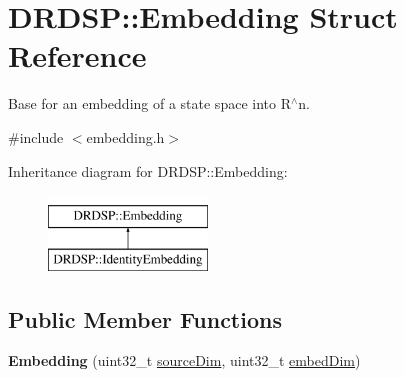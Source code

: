 \hypertarget{struct_d_r_d_s_p_1_1_embedding}{\section{D\-R\-D\-S\-P\-:\-:Embedding Struct Reference}
\label{struct_d_r_d_s_p_1_1_embedding}
}


Base for an embedding of a state space into R$^\wedge$n.  




{\ttfamily \#include $<$embedding.\-h$>$}

Inheritance diagram for D\-R\-D\-S\-P\-:\-:Embedding\-:\begin{figure}[H]
\begin{center}
\leavevmode
\includegraphics[height=2.000000cm]{struct_d_r_d_s_p_1_1_embedding}
\end{center}
\end{figure}
\subsection*{Public Member Functions}
\begin{DoxyCompactItemize}
\item 
\hypertarget{struct_d_r_d_s_p_1_1_embedding_a761628175adca44353dfae4c5adabe1f}{{\bfseries Embedding} (uint32\-\_\-t \hyperlink{struct_d_r_d_s_p_1_1_embedding_a31e1f302b771269d2475538dc0d12e26}{source\-Dim}, uint32\-\_\-t \hyperlink{struct_d_r_d_s_p_1_1_embedding_a43679793e6c6df0de8a564c97b774928}{embed\-Dim})}\label{struct_d_r_d_s_p_1_1_embedding_a761628175adca44353dfae4c5adabe1f}

\end{DoxyCompactItemize}

